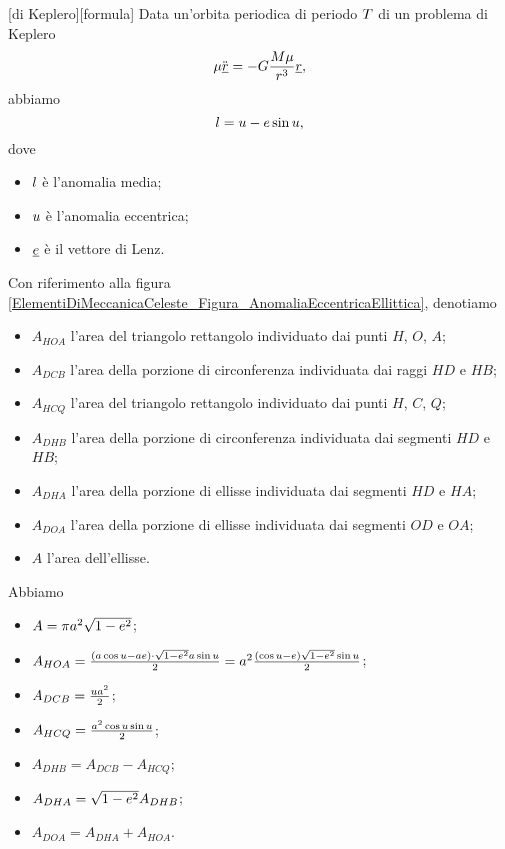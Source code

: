 \begin{Theorem}
	[di Keplero][formula]
	Data un'orbita periodica di periodo $T$ di un problema di Keplero
	\[
		\mu \ddot{\underline{r}}
    = - G \frac{M\mu}{r^3}\underline{r},
	\]
	abbiamo
	\[
		l = u
      - e \sin{u},
	\]
	dove
	\begin{itemize}
		\item $l$ \`e l'anomalia media;
		\item $u$ \`e l'anomalia eccentrica;
		\item $\underline{e}$ \`e il vettore di Lenz.
	\end{itemize}
\end{Theorem}
\Proof Con riferimento alla figura
\ref{ElementiDiMeccanicaCeleste_Figura_AnomaliaEccentricaEllittica},
denotiamo
\begin{itemize}
	\item $A_{HOA}$
    l'area del triangolo rettangolo individuato dai punti $H$, $O$, $A$;
	\item $A_{DCB}$
    l'area della porzione di circonferenza individuata dai raggi $HD$ e
    $HB$;
	\item $A_{HCQ}$
    l'area del triangolo rettangolo individuato dai punti $H$, $C$, $Q$;
	\item $A_{DHB}$
    l'area della porzione di circonferenza individuata dai segmenti $HD$
     e $HB$;
	\item $A_{DHA}$
    l'area della porzione di ellisse individuata dai segmenti $HD$ e
    $HA$;
	\item $A_{DOA}$
    l'area della porzione di ellisse individuata dai segmenti $OD$ e
    $OA$;
	\item $A$ l'area dell'ellisse.
\end{itemize}
\par Abbiamo
\begin{itemize}
	\item $A
    = \pi a^2 \sqrt{1 - e^2}$;
	\item $A_{HOA}
    = \frac{(a \cos{u} - a e) \cdot \sqrt{1 - e^2} a \sin{u}}{2} = a^2 \frac{(\cos{u} - e) \sqrt{1 - e^2} \sin{u}}{2}$;
	\item $A_{DCB}
    = \frac{u a^2}{2}$;
	\item $A_{HCQ}
    = \frac{a^2 \cos{u} \sin{u}}{2}$;
	\item $A_{DHB}
    = A_{DCB} - A_{HCQ}$;
	\item $A_{DHA}
    = \sqrt{1 - e^2} A_{DHB}$;
	\item $A_{DOA}
    = A_{DHA} + A_{HOA}$.
\end{itemize}
